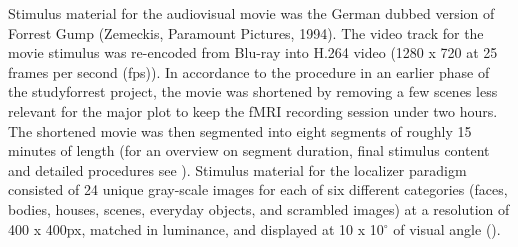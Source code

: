 \documentclass[a4paper, 12pt]{scrreprt}
\begin{document}
Stimulus material for the audiovisual movie was the German dubbed version of Forrest Gump (Zemeckis, Paramount Pictures, 1994). The video track for the movie stimulus was re-encoded from Blu-ray into H.264 video (1280 x 720 at 25 frames per second (fps)). In accordance to the procedure in an earlier phase of the studyforrest project, the movie was shortened by removing a few scenes less relevant for the major plot to keep the fMRI recording session under two hours. The shortened movie was then segmented into eight segments of roughly 15 minutes of length (for an overview on segment duration, final stimulus content and detailed procedures see \textcite{hanke2014high}). Stimulus material for the localizer paradigm consisted of 24 unique gray-scale images for each of six different categories (faces, bodies, houses, scenes, everyday objects, and scrambled images) at a resolution of 400 x 400px, matched in luminance, and displayed at 10 x 10$^\circ$ of visual angle (\cite{sengupta2016studyforrest}). 
\end{document}

